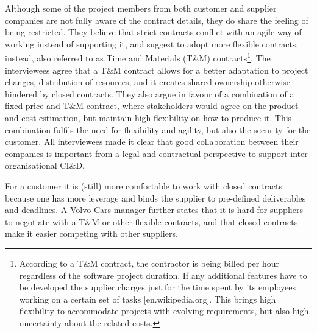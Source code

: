 Although some of the project members from both customer and supplier companies are not fully aware of the contract details, they do share the feeling of being restricted. They believe that strict contracts conflict with an agile way of working instead of supporting it, and suggest to adopt more flexible contracts, instead, also referred to as Time and Materials (T\&M) contracts\footnote{According to a T\&M contract, the contractor is being billed per hour regardless of the software project duration. If any additional features have to be developed the supplier charges just for the time spent by its employees working on a certain set of tasks [en.wikipedia.org]. This brings high flexibility to accommodate projects with evolving requirements, but also high uncertainty about the related costs.}. 
The interviewees agree that a T\&M contract allows for a better adaptation to project changes, distribution of resources, and it creates shared ownership otherwise hindered by closed contracts. They also argue in favour of a combination of a fixed price and T\&M contract, where stakeholders would agree on the product and cost estimation, but maintain high flexibility on how to produce it. This combination fulfils the need for flexibility and agility, but also the security for the customer. All interviewees made it clear that good collaboration between their companies is important from a legal and contractual perspective to support inter-organisational CI\&D.


 For a customer it is (still) more comfortable to work with closed contracts because one has more leverage and binds the supplier to pre-defined deliverables and deadlines. A Volvo Cars manager %
further states that it is hard for suppliers to negotiate with a T\&M or other flexible contracts, and that closed contracts make it easier competing with other suppliers.


